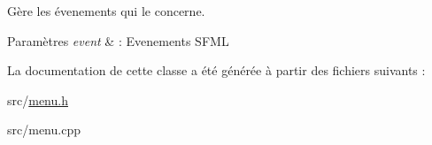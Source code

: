 Gère les évenements qui le concerne. 


\begin{DoxyParams}{Paramètres}
{\em event} & \+: Evenements S\+F\+M\+L \\
\hline
\end{DoxyParams}


La documentation de cette classe a été générée à partir des fichiers suivants \+:\begin{DoxyCompactItemize}
\item 
src/\hyperlink{menu_8h}{menu.\+h}\item 
src/menu.\+cpp\end{DoxyCompactItemize}
